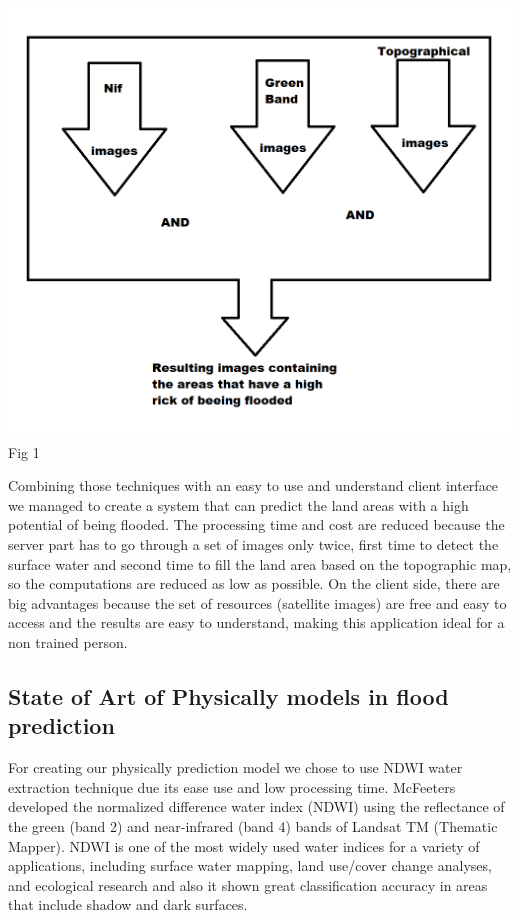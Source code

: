 \documentclass[12pt, a4paper]{report}
\begin{document}
\begin{center}
	\includegraphics[scale=0.6]{application_outline.png} 
	Fig 1
\end{center}

Combining those techniques with an easy to use and understand client interface we managed to create a system that can predict the land areas with a high potential of being flooded. The processing time and cost are reduced because the server part has to go through a set of images only twice, first time to detect the surface water and second time to fill the land area based on the topographic map, so the computations are reduced as low as possible. On the client side, there are big advantages because the set of resources (satellite images) are free and easy to access and the results are easy to understand, making this application ideal for a non trained person.
\par





\subsection{State of Art of Physically models in flood prediction}

\quad
For creating our physically prediction model we chose to use NDWI water extraction technique due its ease use and low processing time. McFeeters \cite{16} developed the normalized difference water index (NDWI) using the reflectance of the green (band 2) and near-infrared (band 4) bands of Landsat TM (Thematic Mapper). NDWI is one of the most widely used water indices for a variety of applications, including surface water mapping, land use/cover change analyses, and ecological research\cite{17-19} and also it shown great classification accuracy in areas that include shadow and dark surfaces.
\end{document}
